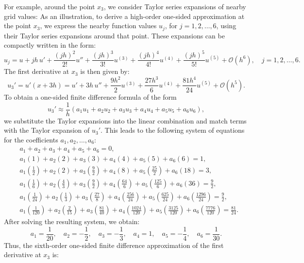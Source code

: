 \documentclass[11pt,a4paper]{amsart}
\theoremstyle{plain}
\theoremstyle{definition}
\theoremstyle{remark}
\numberwithin{equation}{section}
\begin{document}
For example, around the point \( x_3 \), we consider Taylor series expansions of nearby grid values:
As an illustration, to derive a high-order one-sided approximation at the point \( x_3 \), we express the nearby function values \( u_j \), for \( j = 1, 2, \ldots, 6 \), using their Taylor series expansions around that point. These expansions can be compactly written in the form:
\[
u_j = u + jh\, u' + \frac{(jh)^2}{2!} u'' + \frac{(jh)^3}{3!} u^{(3)} + \frac{(jh)^4}{4!} u^{(4)} + \frac{(jh)^5}{5!} u^{(5)} + \mathcal{O}(h^6), \quad j = 1,2,\ldots,6.
\]
The first derivative at \( x_3 \) is then given by:
\[
u_3' = u'(x + 3h) = u' + 3h\, u'' + \frac{9h^2}{2} u^{(3)} + \frac{27h^3}{6} u^{(4)} + \frac{81h^4}{24} u^{(5)} + \mathcal{O}(h^5).
\]
To obtain a one-sided finite difference formula of the form
\[
u_3' \approx \frac{1}{h} \left( a_1 u_1 + a_2 u_2 + a_3 u_3 + a_4 u_4 + a_5 u_5 + a_6 u_6 \right),
\]
we substitute the Taylor expansions into the linear combination and match terms with the Taylor expansion of \( u_3' \). This leads to the following system of equations for the coefficients \( a_1, a_2, \ldots, a_6 \):
\[
\begin{aligned}
& a_1 + a_2 + a_3 + a_4 + a_5 + a_6 = 0, \\
& a_1(1) + a_2(2) + a_3(3) + a_4(4) + a_5(5) + a_6(6) = 1, \\
& a_1 \left( \frac{1}{2} \right) + a_2(2) + a_3 \left( \frac{9}{2} \right) + a_4(8) + a_5 \left( \frac{25}{2} \right) + a_6(18) = 3, \\
& a_1 \left( \frac{1}{6} \right) + a_2 \left( \frac{4}{3} \right) + a_3 \left( \frac{9}{2} \right) + a_4 \left( \frac{64}{6} \right) + a_5 \left( \frac{125}{6} \right) + a_6(36) = \frac{9}{2}, \\
& a_1 \left( \frac{1}{24} \right) + a_2 \left( \frac{1}{3} \right) + a_3 \left( \frac{27}{8} \right) + a_4 \left( \frac{256}{24} \right) + a_5 \left( \frac{625}{24} \right) + a_6 \left( \frac{1296}{24} \right) = \frac{9}{2}, \\
& a_1 \left( \frac{1}{120} \right) + a_2 \left( \frac{2}{15} \right) + a_3 \left( \frac{81}{40} \right) + a_4 \left( \frac{1024}{120} \right) + a_5 \left( \frac{3125}{120} \right) + a_6 \left( \frac{7776}{120} \right) = \frac{81}{24}.
\end{aligned}
\]
After solving the resulting system, we obtain:
\[
a_1 = \frac{1}{20}, \quad a_2 = -\frac{1}{2}, \quad a_3 = -\frac{1}{3}, \quad a_4 = 1, \quad a_5 = -\frac{1}{4}, \quad a_6 = \frac{1}{30}.
\]
Thus, the sixth-order one-sided finite difference approximation of the first derivative at \( x_3 \) is:
\end{document}
